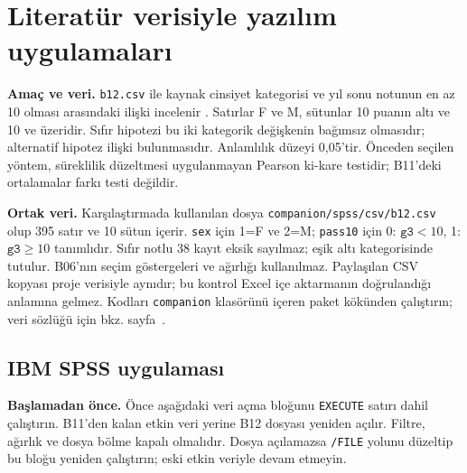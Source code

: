\section{Literatür verisiyle yazılım uygulamaları}
\label{sec:spss-b12}

\textbf{Amaç ve veri.} \texttt{b12.csv} ile kaynak cinsiyet kategorisi
ve yıl sonu notunun en az 10 olması arasındaki ilişki incelenir
\citep{cortez2008data}. Satırlar F ve M, sütunlar 10 puanın altı ve
10 ve üzeridir. Sıfır hipotezi bu iki kategorik değişkenin bağımsız
olmasıdır; alternatif hipotez ilişki bulunmasıdır. Anlamlılık düzeyi
0,05'tir. Önceden seçilen yöntem, süreklilik düzeltmesi uygulanmayan
Pearson ki-kare testidir; B11'deki ortalamalar farkı testi değildir.

\textbf{Ortak veri.} Karşılaştırmada kullanılan dosya
\nolinkurl{companion/spss/csv/b12.csv} olup 395 satır ve 10 sütun
içerir. \texttt{sex} için 1=F ve 2=M; \texttt{pass10} için
0: $\texttt{g3}<10$, 1: $\texttt{g3}\geq10$ tanımlıdır.
Sıfır notlu 38 kayıt eksik sayılmaz; eşik altı kategorisinde tutulur.
B06'nın seçim göstergeleri ve ağırlığı kullanılmaz. Paylaşılan CSV
kopyası proje verisiyle aynıdır; bu kontrol Excel içe aktarmanın
doğrulandığı anlamına gelmez. Kodları \texttt{companion} klasörünü
içeren paket kökünden çalıştırın; veri sözlüğü için bkz.
sayfa~\pageref{sec:spss-guide}.

\subsection{IBM SPSS uygulaması}
\textbf{Başlamadan önce.} Önce aşağıdaki veri açma bloğunu
\texttt{EXECUTE} satırı dahil çalıştırın. B11'den kalan etkin veri
yerine B12 dosyası yeniden açılır. Filtre, ağırlık ve dosya bölme
kapalı olmalıdır. Dosya açılamazsa \texttt{/FILE} yolunu düzeltip
bu bloğu yeniden çalıştırın; eski etkin veriyle devam etmeyin.

\begin{spssadimlar}
\end{spssadimlar}

